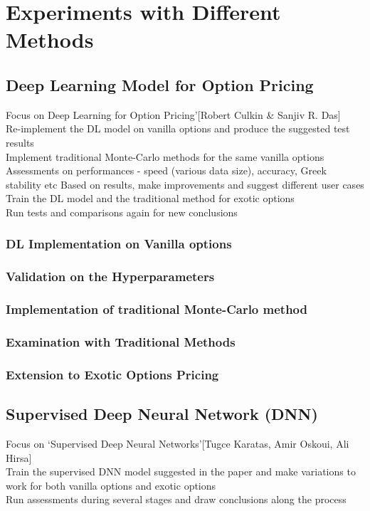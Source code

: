 \documentclass{report}
\begin{document}
\chapter{Experiments with Different Methods}

\section{Deep Learning Model for Option Pricing}
Focus on Deep Learning for Option Pricing’[Robert Culkin & Sanjiv R. Das]\\
Re-implement the DL model on vanilla options and produce the suggested test results\\
Implement traditional Monte-Carlo methods for the same vanilla options \\
Assessments on performances - speed (various data size), accuracy, Greek stability etc
Based on results, make improvements and suggest different user cases\\
Train the DL model and the traditional method for exotic options\\
Run tests and comparisons again for new conclusions

\subsection{DL Implementation on Vanilla options}
\subsection{Validation on the Hyperparameters}
\subsection{Implementation of  traditional Monte-Carlo method}
\subsection{Examination with Traditional Methods}
\subsection{Extension to Exotic Options Pricing}

\section{Supervised Deep Neural Network (DNN)}
Focus on ‘Supervised Deep Neural Networks’[Tugce Karatas, Amir Oskoui, Ali Hirsa]\\
Train the supervised DNN model suggested in the paper and make variations to work for both vanilla options and exotic options\\
Run assessments during several stages and draw conclusions along the process
\end{document}

